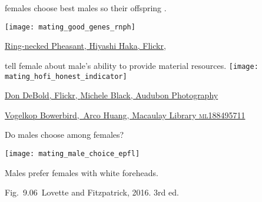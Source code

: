 \documentclass[t]{beamer}
\newcommand{\cornell}[1]{Fig.~#1~Lovette and Fitzpatrick, 2016. 3rd ed.}
\begin{document}

\begin{frame}[t]{ females choose best males so their offspring .}

\vspace{-0.5\baselineskip}
\centering
\texttt{[image: mating\_good\_genes\_rnph]}

\vfilll

\tinyfill \href{https://www.flickr.com/photos/36542741@N03/4454127334}{Ring-necked Pheasant, Hiyashi Haka, Flickr, }

\end{frame}


\begin{frame}[t]{ tell female about male's ability to provide material resources.}
\vspace{-0.5\baselineskip}
\centering
\texttt{[image: mating\_hofi\_honest\_indicator]}

\vfilll

\tiny \href{https://www.flickr.com/photos/28156071@N00/4104955050}{Don DeBold, Flickr, } \hfill \href{https://www.audubon.org/news/house-finch-or-purple-finch-heres-how-tell-them-apart}{Michele Black, Audubon Photography}


\end{frame}


{
\begin{frame}[b,plain]
	
	\tinyfill \textcolor{white}{ \href{https://macaulaylibrary.org/asset/188495711}{Vogelkop Bowerbird, \textcopyright\,Arco Huang, Macaulay Library \textsc{ml188495711}}} 
\end{frame}
}



\begin{frame}[t]{Do males choose among females?}

\vspace{-0.5\baselineskip}
\texttt{[image: mating\_male\_choice\_epfl]}

\hangpara \hfill Males prefer females with white foreheads.

\vfilll

\tinyfill \cornell{9.06}

\end{frame}
\end{document}
